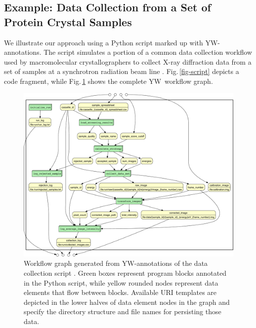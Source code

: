 \documentclass[letterpaper,twocolumn,10pt]{article}
\newcommand{\figref}[1]{Fig.\,\ref{#1}}
\newcommand{\YW}{\textsf{YesWorkflow}}
\newcommand{\yw}{\textsf{YW}}
\begin{document}



\subsection{Example: Data Collection from a Set of Protein Crystal
  Samples}
We illustrate our approach using a Python script marked up with
\yw-annotations.  The script simulates a portion of a common data
collection workflow used by macromolecular crystallographers to
collect X-ray diffraction data from a set of samples at a synchrotron
radiation beam line \protect\cite{tsai2013autodrug}.
\figref{fig-script} depicts a code fragment, while
\figref{fig-wfgraph} shows the complete \yw\ workflow graph.


\begin{figure}[th]
  \centering
  \includegraphics[width=.8\textwidth]{combined-crop.pdf}
  \caption{\small Workflow graph generated from \yw-annotations of the
    data collection script \cite{mcphillips2015example}.  Green boxes
    represent program blocks annotated in the Python script, while
    yellow rounded nodes represent data elements that flow between
    blocks.  Available URI templates are 
    depicted in the lower halves of data element nodes in
    the graph and specify the directory structure and file names for
    persisting those data. }
  \label{fig-wfgraph}
\end{figure}
\end{document}
